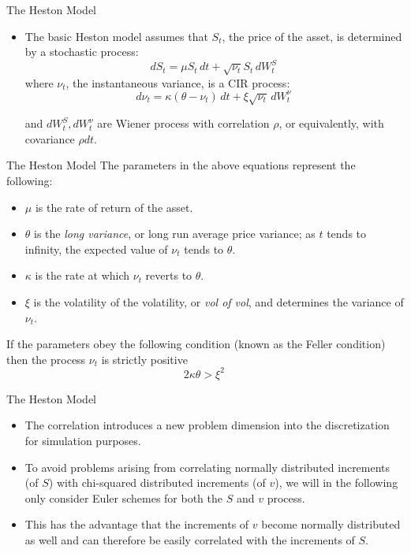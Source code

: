 \documentclass[11pt]{beamer}
\begin{document}
\begin{frame}{The Heston Model}
\begin{itemize}
\item The basic Heston model assumes that $S_t$, the price of the asset, is determined by a stochastic process:
$$
dS_t = \mu S_t\,dt + \sqrt{\nu_t} S_t\,dW^S_t \,
$$
where $\nu_t$, the instantaneous variance, is a CIR process:
$$
d\nu_t = \kappa(\theta - \nu_t)\,dt + \xi \sqrt{\nu_t}\,dW^{\nu}_t \,
$$

and $dW^S_t, dW^{\nu}_t$ are Wiener process with correlation $\rho$, or equivalently, with covariance $\rho dt$.

\end{itemize}
\end{frame}
\begin{frame}{The Heston Model}
The parameters in the above equations represent the following:
\begin{itemize}
\item $\mu$ is the rate of return of the asset.
\item $\theta$ is the \textit{long variance}, or long run average price variance; as $t$ tends to infinity, the expected value of $\nu_t$ tends to $\theta$.
\item $\kappa$ is the rate at which $\nu_t$ reverts to $\theta$.
\item $\xi$ is the volatility of the volatility, or \textit{vol of vol}, and determines the variance of $\nu_t$.
\end{itemize}
If the parameters obey the following condition (known as the Feller condition) then the process $\nu_t$ is strictly positive 
$$
2 \kappa \theta > \xi^2 \, 
$$

\end{frame}
\begin{frame}{The Heston Model}
\begin{itemize}
\item The correlation introduces a new problem dimension into the discretization for simulation purposes. 
\item To avoid problems arising from correlating normally distributed increments (of $S$) with chi-squared distributed increments (of $v$), we will in the following only consider Euler schemes for both the $S$ and $v$ process. 
\item This has the advantage that the increments of $v$ become normally distributed as well and can therefore be easily correlated with the increments of $S$.
\end{itemize}
\end{frame}
\end{document}
